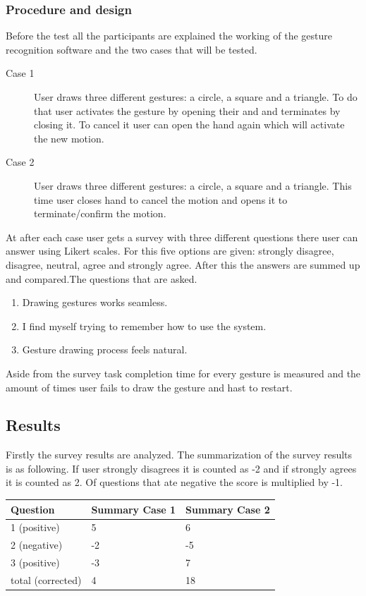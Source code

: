 \documentclass[11pt,a4paper]{article}
\begin{document}
\subsubsection{Procedure and design}
Before the test all the participants are explained the working of the gesture recognition software and the two cases that will be tested.

\begin{description}
\item[Case 1] User draws three different gestures: a circle, a square and a triangle. To do that user activates the gesture by opening their and and terminates by closing it. To cancel it user can open the hand again which will activate the new motion.
\item[Case 2] User draws three different gestures: a circle, a square and a triangle. This time user closes hand to cancel the motion and opens it to terminate/confirm the motion.
\end{description}

At after each case user gets a survey with three different questions there user can answer using Likert scales. For this five options are given: strongly disagree, disagree, neutral, agree and strongly agree. After this the answers are summed up and compared.The questions that are asked.\bigskip


\begin{enumerate}
\item Drawing gestures works seamless.
\item I find myself trying to remember how to use the system.
\item Gesture drawing process feels natural.
\end{enumerate}

Aside from the survey task completion time for every gesture is measured and the amount of times user fails to draw the gesture and hast to restart.

\subsection{Results}
Firstly the survey results are analyzed. The summarization of the survey results is as following. If user strongly disagrees it is counted as -2 and if strongly agrees it is counted as 2. Of questions that ate negative the score is multiplied by -1.

\begin{center}
\begin{tabular}{ |l|l|l| }
\hline
Question & Summary Case 1 & Summary Case 2 \\
\hline
1 (positive) & 5 & 6 \\
2 (negative) & -2 & -5 \\
3 (positive) & -3 & 7 \\
\hline
total (corrected) & 4 & 18 \\
\hline
\end{tabular}
\end{center}
\end{document}
